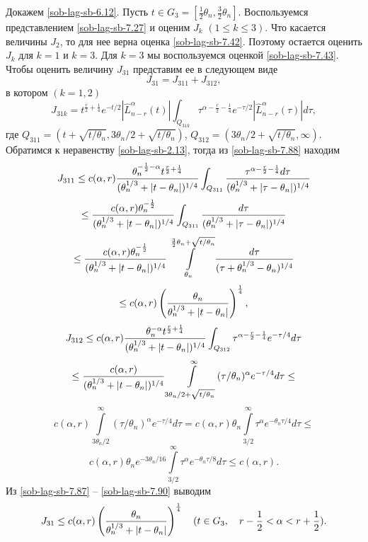 Докажем \eqref{sob-lag-sb-6.12}. Пусть $t\in G_3=[\frac{1}{2}\theta_n,\frac32\theta_n]$. Воспользуемся представлением \eqref{sob-lag-sb-7.27} и оценим $J_k$ $(1\le k\le3)$. Что касается величины  $J_2$, то для нее верна оценка \eqref{sob-lag-sb-7.42}. Поэтому остается оценить $J_k$  для $k=1$  и  $k=3$. Для $k=3$ мы воспользуемся оценкой \eqref{sob-lag-sb-7.43}. Чтобы оценить величину $J_{31}$ представим ее в следующем виде
\begin{equation}\label{sob-lag-sb-7.87}
J_{31}=J_{311}+J_{312},
\end{equation}
в котором $(k=1,2)$
  \begin{equation}\label{sob-lag-sb-7.88}
J_{31k}=t^{\frac{r}{2}+\frac14}e^{-t/2}|\hat L_{n-r}^\alpha(t)|\int_{Q_{31k}}\tau^{\alpha-\frac{r}{2}-\frac14}e^{-\tau/2}|\hat L_{n-r}^\alpha(\tau)|d\tau,
\end{equation}
где $Q_{311}=(t+\sqrt{t/\theta_n},3\theta_n/2+\sqrt{t/\theta_n})$,  $Q_{312}=(3\theta_n/2+\sqrt{t/\theta_n},\infty)$.
Обратимся к  неравенству \eqref{sob-lag-sb-2.13}, тогда из  \eqref{sob-lag-sb-7.88} находим
$$
J_{311}\le c(\alpha,r){\theta_n^{-\frac12-\alpha}t^{\frac{r}{2}+\frac14}\over(\theta_n^{1/3}+|t-\theta_n|)^{1/4}}
\int_{Q_{311}}{\tau^{\alpha-\frac{r}{2}-\frac14}d\tau\over(\theta_n^{1/3}+|\tau-\theta_n|)^{1/4}}
$$
$$
\le {c(\alpha,r)\theta_n^{-\frac12}\over(\theta_n^{1/3}+|t-\theta_n|)^{1/4}}
\int_{Q_{311}}{d\tau\over(\theta_n^{1/3}+|\tau-\theta_n|)^{1/4}}
$$
$$
\le {c(\alpha,r)\theta_n^{-\frac12}\over(\theta_n^{1/3}+|t-\theta_n|)^{1/4}}
\int\limits_{\theta_n}^{\frac32\theta_n+\sqrt{t/\theta_n}}{d\tau\over(\tau+ \theta_n^{1/3}-\theta_n)^{1/4}}
$$
\begin{equation}\label{sob-lag-sb-7.89}
\le c(\alpha,r)\left({\theta_n\over\theta_n^{1/3}+|t-\theta_n|}\right)^\frac14,
\end{equation}
$$
J_{312}\le c(\alpha,r){\theta_n^{-\alpha}t^{\frac{r}{2}+\frac14}\over(\theta_n^{1/3}+|t-\theta_n|)^{1/4}}
\int_{Q_{312}}\tau^{\alpha-\frac{r}{2}-\frac14}e^{-\tau/4}d\tau
$$
$$
\le {c(\alpha,r)\over(\theta_n^{1/3}+|t-\theta_n|)^{1/4}}
\int\limits_{3\theta_n/2+\sqrt{t/\theta_n}}^\infty(\tau/\theta_n)^{\alpha}e^{-\tau/4}d\tau\le $$
$$
c(\alpha,r)
\int\limits_{3\theta_n/2}^\infty(\tau/\theta_n)^{\alpha}e^{-\tau/4}d\tau=
c(\alpha,r)\theta_n
\int\limits_{3/2}^\infty\tau^{\alpha}e^{-\theta_n\tau/4}d\tau\le
$$
\begin{equation}\label{sob-lag-sb-7.90}
c(\alpha,r)\theta_ne^{-3\theta_n/16}
\int\limits_{3/2}^\infty\tau^{\alpha}e^{-\theta_n\tau/8}d\tau\le c(\alpha,r).
\end{equation}
Из \eqref{sob-lag-sb-7.87} -- \eqref{sob-lag-sb-7.90} выводим
\begin{equation}\label{sob-lag-sb-7.91}
J_{31}\le c(\alpha,r)\left({\theta_n\over\theta_n^{1/3}+|t-\theta_n|}\right)^\frac14\quad (t\in G_3, \quad r-\frac12<\alpha<r+\frac12).
\end{equation}

